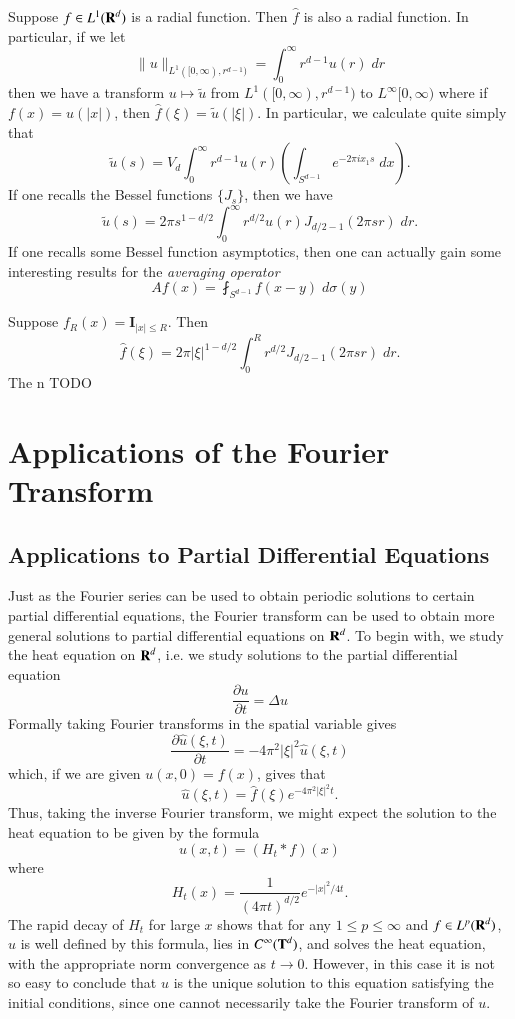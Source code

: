 Suppose $f \in L^1(\operatorname{\mathbf{R}}^d)$ is a radial function. Then $\widehat{f}$ is also a radial function. In particular, if we let
%
\[ \| u \|_{L^1([0,\infty), r^{d-1})} = \int_0^\infty r^{d-1} u(r)\; dr \]
%
then we have a transform $u \mapsto \tilde{u}$ from $L^1([0,\infty), r^{d-1})$ to $L^\infty[0,\infty)$ where if $f(x) = u(|x|)$, then $\widehat{f}(\xi) = \tilde{u}(|\xi|)$. In particular, we calculate quite simply that
%
\[ \tilde{u}(s) = V_d \int_0^\infty r^{d-1} u(r) \left( \int_{S^{d-1}} e^{-2 \pi i x_1 s}\; dx \right). \]
%
If one recalls the Bessel functions $\{ J_s \}$, then we have
%
\[ \tilde{u}(s) = 2\pi s^{1 - d/2} \int_0^\infty r^{d/2} u(r) J_{d/2-1}(2 \pi s r)\; dr. \]
%
If one recalls some Bessel function asymptotics, then one can actually gain some interesting results for the \emph{averaging operator}
%
\[ Af(x) = \fint_{S^{d-1}} f(x-y)\; d\sigma(y) \]
%

\begin{example}
    Suppose $f_R(x) = \mathbf{I}_{|x| \leq R}$. Then
    \[ \widehat{f}(\xi) = 2 \pi |\xi|^{1-d/2} \int_0^R r^{d/2} J_{d/2-1}(2 \pi s r)\; dr. \]
    The n TODO
\end{example}



\chapter{Applications of the Fourier Transform}

\section{Applications to Partial Differential Equations}

Just as the Fourier series can be used to obtain periodic solutions to certain partial differential equations, the Fourier transform can be used to obtain more general solutions to partial differential equations on $\operatorname{\mathbf{R}}^d$. To begin with, we study the heat equation on $\operatorname{\mathbf{R}}^d$, i.e. we study solutions to the partial differential equation
%
\[ \frac{\partial u}{\partial t} = \Delta u \]
%
Formally taking Fourier transforms in the spatial variable gives
%
\[ \frac{\partial \widehat{u}(\xi,t)}{\partial t} = - 4 \pi^2 |\xi|^2 \widehat{u}(\xi,t) \]
%
which, if we are given $u(x,0) = f(x)$, gives that
%
\[ \widehat{u}(\xi,t) = \widehat{f}(\xi) e^{- 4 \pi^2 |\xi|^2 t}. \]
%
Thus, taking the inverse Fourier transform, we might expect the solution to the heat equation to be given by the formula
%
\[ u(x,t) = (H_t * f)(x) \]
%
where
%
\[ H_t(x) = \frac{1}{(4 \pi t)^{d/2}} e^{- |x|^2 / 4 t}. \]
%
The rapid decay of $H_t$ for large $x$ shows that for any $1 \leq p \leq \infty$ and $f \in L^p(\operatorname{\mathbf{R}}^d)$, $u$ is well defined by this formula, lies in $C^\infty(\operatorname{\mathbf{T}}^d)$, and solves the heat equation, with the appropriate norm convergence as $t \to 0$. However, in this case it is not so easy to conclude that $u$ is the unique solution to this equation satisfying the initial conditions, since one cannot necessarily take the Fourier transform of $u$.


